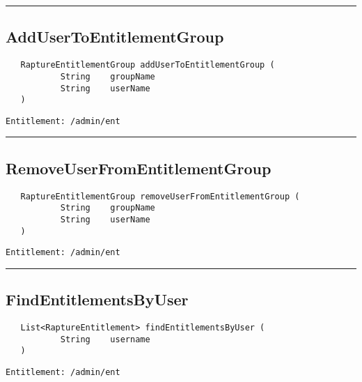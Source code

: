 \rule{12cm}{2pt}
\subsection{AddUserToEntitlementGroup}
\label{Api:AddUserToEntitlementGroup}
\begin{verbatim}
   RaptureEntitlementGroup addUserToEntitlementGroup (
           String    groupName
           String    userName
   )
\end{verbatim}
\begin{Verbatim}[fontsize=\small, formatcom=\color{Maroon}]
  Entitlement: /admin/ent
\end{Verbatim}



\rule{12cm}{2pt}
\subsection{RemoveUserFromEntitlementGroup}
\label{Api:RemoveUserFromEntitlementGroup}
\begin{verbatim}
   RaptureEntitlementGroup removeUserFromEntitlementGroup (
           String    groupName
           String    userName
   )
\end{verbatim}
\begin{Verbatim}[fontsize=\small, formatcom=\color{Maroon}]
  Entitlement: /admin/ent
\end{Verbatim}



\rule{12cm}{2pt}
\subsection{FindEntitlementsByUser}
\label{Api:FindEntitlementsByUser}
\begin{verbatim}
   List<RaptureEntitlement> findEntitlementsByUser (
           String    username
   )
\end{verbatim}
\begin{Verbatim}[fontsize=\small, formatcom=\color{Maroon}]
  Entitlement: /admin/ent
\end{Verbatim}



